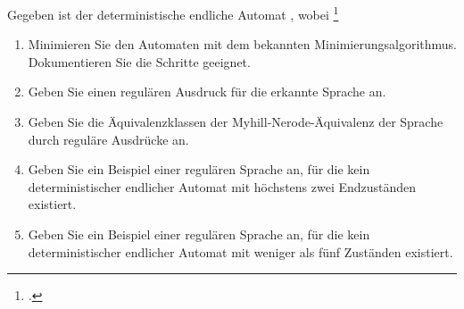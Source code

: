 \documentclass{bschlangaul-aufgabe}
\begin{document}

Gegeben ist der deterministische endliche Automat
, wobei
\footcite{examen:66115:2016:09}

\begin{enumerate}
\item Minimieren Sie den Automaten mit dem bekannten
Minimierungsalgorithmus. Dokumentieren Sie die Schritte geeignet.

\item Geben Sie einen regulären Ausdruck für die erkannte Sprache an.

\item Geben Sie die Äquivalenzklassen der Myhill-Nerode-Äquivalenz der
Sprache durch reguläre Ausdrücke an.

\item Geben Sie ein Beispiel einer regulären Sprache an, für die kein
deterministischer endlicher Automat mit höchstens zwei Endzuständen
existiert.

\item Geben Sie ein Beispiel einer regulären Sprache an, für die kein
deterministischer endlicher Automat mit weniger als fünf Zuständen
existiert.
\end{enumerate}
\end{document}
